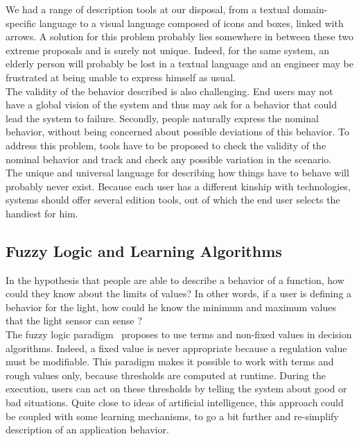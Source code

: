 We had a range of description tools at our disposal, from a textual domain-specific language to a visual language composed of icons and boxes, linked with arrows. A solution for this problem probably lies somewhere in between these two extreme proposals and is surely not unique. Indeed, for the same system, an elderly person will probably be lost in a textual language and an engineer may be frustrated at being unable to express himself as usual.\\

The validity of the behavior described is also challenging. End users may not have a global vision of the system and thus may ask for a behavior that could lead the system to failure. Secondly, people naturally express the nominal behavior, without being concerned about possible deviations of this behavior. To address this problem, tools have to be proposed to check the validity of the nominal behavior and track and check any possible variation in the scenario.\\

The unique and universal language for describing how things have to behave will probably never exist. Because each user has a different kinship with technologies, systems should offer several edition tools, out of which the end user selects the handiest for him.


\subsection{Fuzzy Logic and Learning Algorithms}

In the hypothesis that people are able to describe a behavior of a function, how could they know about the limits of values? In other words, if a user is defining a behavior for the light, how could he know the minimum and maximum values that the light sensor can sense ?\\
The fuzzy logic paradigm~\cite{Chauvel:2008,Mendel:2001} proposes to use terms and non-fixed values in decision algorithms. Indeed, a fixed value is never appropriate because a regulation value must be modifiable. This paradigm makes it possible to work with terms and rough values only, because thresholds are computed at runtime. During the execution, users can act on these thresholds by telling the system about good or bad situations. Quite close to ideas of artificial intelligence, this approach could be coupled with some learning mechanisms, to go a bit further and re-simplify description of an application behavior.

